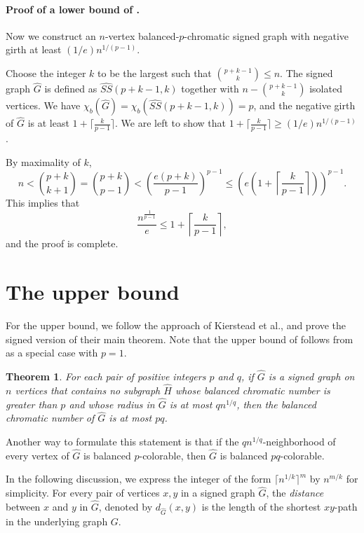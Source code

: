 \documentclass{article}
\newcommand{\SSG}{\mathit{SS}} %
\newcommand{\HSS}{\widehat{\SSG}}
\newtheorem{theorem}{Theorem}[section]
\begin{document}
\paragraph{Proof of a lower bound of .}Now we construct an $n$-vertex balanced-$p$-chromatic signed graph with negative girth at least $(1/e)n^{1/(p-1)}$.

Choose the integer $k$ to be the largest such that $\binom{p+k-1}{k}\leq n$. The signed graph $\widehat{G}$ is defined as $\HSS(p+k-1,k)$ together with $n-\binom{p+k-1}{k}$ isolated vertices. We have $\chi_b(\widehat{G})=\chi_b(\HSS(p+k-1,k))=p$, and the negative girth of $\widehat{G}$ is at least $1+\lceil\frac{k}{p-1}\rceil$. We are left to show that $1+\lceil\frac{k}{p-1}\rceil\geq (1/e)n^{1/(p-1)}$.

By maximality of $k$,
$$n<\binom{p+k}{k+1}=\binom{p+k}{p-1}<\left(\frac{e(p+k)}{p-1}\right)^{p-1}\leq \left(e\left(1+\left\lceil\frac{k}{p-1}\right\rceil\right)\right)^{p-1}.$$
This implies that
$$\frac{n^{\frac{1}{p-1}}}{e}\leq 1+\left\lceil\frac{k}{p-1}\right\rceil,$$
and the proof is complete.

\section{The upper bound}
For the upper bound, we follow the approach of Kierstead et al.\cite{KST84}, and prove the signed version of their main theorem. Note that the upper bound of  follows from  as a special case with $p=1$.



\begin{theorem}\label{thm:signedKST}
    For each pair of positive integers $p$ and $q$, if $\widehat{G}$ is a signed graph on $n$ vertices that contains no subgraph $\widehat{H}$ whose balanced chromatic number is greater than $p$ and whose radius in $\widehat{G}$ is at most $qn^{1/q}$, then the balanced chromatic number of $\widehat{G}$ is at most $pq$.
\end{theorem}
Another way to formulate this statement is that if the $qn^{1/q}$-neighborhood of every vertex of $\widehat{G}$ is balanced $p$-colorable, then $\widehat{G}$ is balanced $pq$-colorable.



In the following discussion, we express the integer of the form $\lceil n^{1/k}\rceil^m$ by $n^{m/k}$ for simplicity. For every pair of vertices $x,y$ in a signed graph $\widehat{G}$, the \emph{distance} between $x$ and $y$ in $\widehat{G}$, denoted by $d_{\widehat{G}}(x,y)$ is the length of the shortest $xy$-path in the underlying graph $G$.
\end{document}

